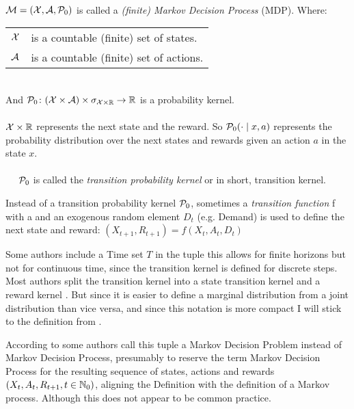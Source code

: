 \begin{definition} \leavevmode \\ 
	\(\mathcal{M}=(\mathcal{X},\mathcal{A},\mathcal{P}_0) \) is called a \emph{(finite) Markov Decision Process} (MDP). Where:
	\par\begin{tabular}{l l}
		\(\mathcal{X}\) & is a countable (finite) set of states.\\
		\(\mathcal{A}\) & is a countable (finite) set of actions.
	\end{tabular}\\
	And \(\mathcal{P}_0\colon (\mathcal{X}\times\mathcal{A}) \times \sigma_{\mathcal{X}\times\mathbb{R}} \to \mathbb{R}\) is a probability kernel.\\ \\
	\(\mathcal{X}\times\mathbb{R}\) represents the next state and the reward. So \(\mathcal{P}_0(\cdot\mid x,a) \) represents the probability distribution over the next states and rewards given an action \(a\) in the state \(x\).
	\\ \\
	\(\quad\) \(\mathcal{P}_0\) is called the \emph{transition probability kernel} or in short, transition kernel. 
\end{definition}
\begin{remark}
	Instead of a transition probability kernel \(\mathcal{P}_0\), sometimes a \emph{transition function} f with a and an exogenous random element \(D_t\) (e.g. Demand) is used to define the next state and reward: \((X_{t+1},R_{t+1})=f(X_t,A_t,D_t)\)

	Some authors include a Time set \(T\) in the tuple \parencite[e.g.][]{putermanMarkovDecisionProcesses2014} this allows for finite horizons but not for continuous time, since the transition kernel is defined for discrete steps. Most authors split the transition kernel into a state transition kernel and a reward kernel \parencite[e.g.][]{putermanMarkovDecisionProcesses2014}. But since it is easier to define a marginal distribution from a joint distribution than vice versa, and since this notation is more compact I will stick to the definition from \textcite{szepesvariAlgorithmsReinforcementLearning2010}.
\end{remark}

According to \textcite{putermanMarkovDecisionProcesses2014} some authors call this tuple a Markov Decision Problem instead of Markov Decision Process, presumably to reserve the term Markov Decision Process for the resulting sequence of states, actions and rewards \((X_t,A_t,R_{t+1},t\in\mathbb{N}_0)\), aligning the Definition with the definition of a Markov process. Although this does not appear to be common practice.

